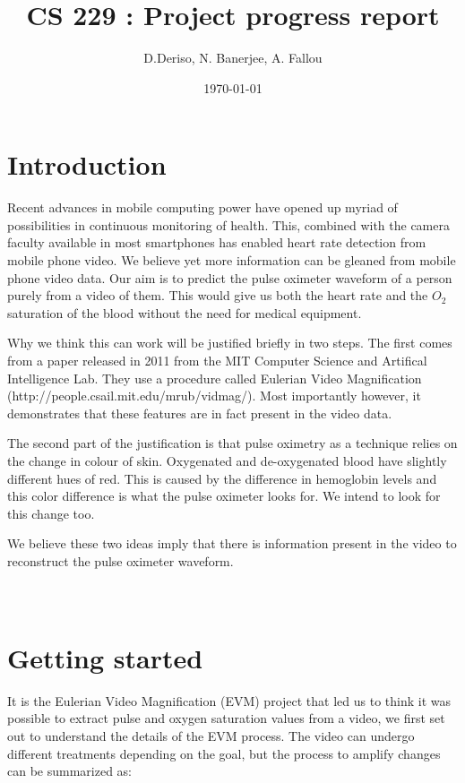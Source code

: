 \documentclass[12pt]{article}
\begin{document}
  \title{CS 229 : Project progress report}
  \author{D.Deriso, N. Banerjee, A. Fallou}
  \date{\today}
  \maketitle
  \thispagestyle{empty}

\section*{Introduction}
%
\small Recent advances in mobile computing power have opened up myriad of possibilities in continuous monitoring of health. 
This, combined with the camera faculty available in most smartphones has enabled heart rate detection from mobile phone video. 
We believe yet more information can be gleaned from mobile phone video data. 
Our aim is to predict the pulse oximeter waveform of a person purely from a video of them. 
This would give us both the heart rate and the $O_2$ saturation of the blood without the need for medical equipment.

Why we think this can work will be justified briefly in two steps. 
The first comes from a paper released in 2011 from the MIT Computer Science and Artifical Intelligence Lab. 
They use a procedure called Eulerian Video Magnification (http://people.csail.mit.edu/mrub/vidmag/).  
Most importantly however, it demonstrates that these features are in fact present in the video data.

The second part of the justification is that pulse oximetry as a technique relies on the change in colour of skin. 
Oxygenated and de-oxygenated blood have slightly different hues of red.
This is caused by the difference in hemoglobin levels and this color difference is what the pulse oximeter looks for. 
We intend to look for this change too.

We believe these two ideas imply that there is information present in the video to reconstruct the pulse oximeter waveform.\\
\\
\\
\section{Getting started}

  It is the Eulerian Video Magnification (EVM) project that led us to think it was possible to extract pulse and oxygen saturation values from a video,
  we first set out to understand the details of the EVM process. The video can undergo different treatments depending on the goal, but the process to amplify changes 
  can be summarized as:
\end{document}
